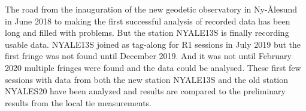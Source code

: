 The road from the inauguration of the new geodetic observatory in Ny-\AA lesund in June 2018 to making the first successful
analysis of recorded data has been long and filled with problems. But the station NYALE13S is finally recording usable 
data. NYALE13S joined as tag-along for R1 sessions in July 2019 but the first fringe was not found until December 2019. 
And it was not until February 2020 multiple fringes were found and the data could be analysed. These first few sessions with
data from both the new station NYALE13S and the old station NYALES20 have been analyzed and results are compared to the 
preliminary results from the local tie measurements.

\endinput
